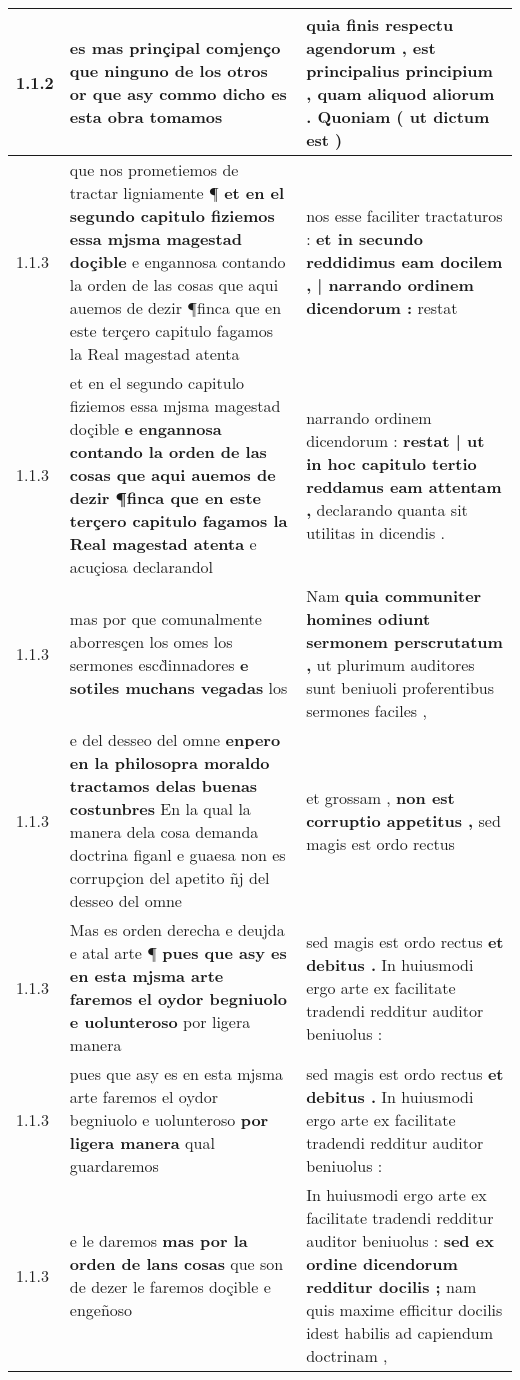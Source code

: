 \begin{tabular}{|p{1cm}|p{6.5cm}|p{6.5cm}|}
1.1.2 & es \textbf{ mas prinçipal comjenço que ninguno de los otros } or que asy commo dicho es esta obra tomamos & quia finis respectu agendorum , est principalius principium , \textbf{ quam aliquod aliorum . } Quoniam ( ut dictum est ) \\\hline
1.1.3 & que nos prometiemos de tractar ligniamente ¶ \textbf{ et en el segundo capitulo fiziemos essa mjsma magestad doçible } e engannosa contando la orden de las cosas que aqui auemos de dezir ¶finca que en este terçero capitulo fagamos la Real magestad atenta & nos esse faciliter tractaturos : \textbf{ et in secundo reddidimus eam docilem , | narrando ordinem dicendorum : } restat \\\hline
1.1.3 & et en el segundo capitulo fiziemos essa mjsma magestad doçible \textbf{ e engannosa contando la orden de las cosas que aqui auemos de dezir ¶finca que en este terçero capitulo fagamos la Real magestad atenta } e acuçiosa declarandol & narrando ordinem dicendorum : \textbf{ restat | ut in hoc capitulo tertio reddamus eam attentam , } declarando quanta sit utilitas in dicendis . \\\hline
1.1.3 & mas por que comunalmente aborresçen los omes los sermones escd̀innadores \textbf{ e sotiles muchans vegadas } los & Nam \textbf{ quia communiter homines odiunt sermonem perscrutatum , } ut plurimum auditores sunt beniuoli proferentibus sermones faciles , \\\hline
1.1.3 & e del desseo del omne \textbf{ enpero en la philosopra moraldo tractamos delas buenas costunbres } En la qual la manera dela cosa demanda doctrina figanl e guaesa non es corrupçion del apetito ñj del desseo del omne & et grossam , \textbf{ non est corruptio appetitus , } sed magis est ordo rectus \\\hline
1.1.3 & Mas es orden derecha e deujda e atal arte ¶ \textbf{ pues que asy es en esta mjsma arte faremos el oydor begniuolo e uolunteroso } por ligera manera & sed magis est ordo rectus \textbf{ et debitus . } In huiusmodi ergo arte ex facilitate tradendi redditur auditor beniuolus : \\\hline
1.1.3 & pues que asy es en esta mjsma arte faremos el oydor begniuolo e uolunteroso \textbf{ por ligera manera } qual guardaremos & sed magis est ordo rectus \textbf{ et debitus . } In huiusmodi ergo arte ex facilitate tradendi redditur auditor beniuolus : \\\hline
1.1.3 & e le daremos \textbf{ mas por la orden de lans cosas } que son de dezer le faremos doçible e engeñoso & In huiusmodi ergo arte ex facilitate tradendi redditur auditor beniuolus : \textbf{ sed ex ordine dicendorum redditur docilis ; } nam quis maxime efficitur docilis idest habilis ad capiendum doctrinam , \\\hline

\end{tabular}
